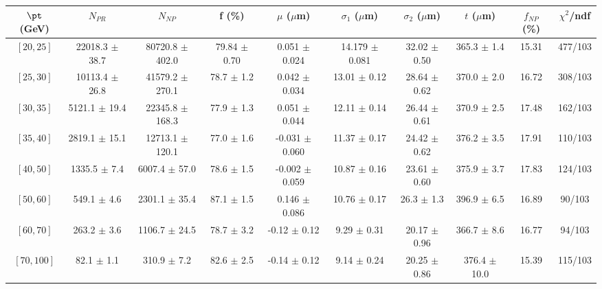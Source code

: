 \begin{tabular}{c||c|c|c|c|c|c|c||c|c}
$\pt$ (GeV) & $N_{PR}$ & $N_{NP}$ & f (\%) & $\mu$ ($\mu$m) & $\sigma_1$ ($\mu$m) & $\sigma_2$ ($\mu$m)  & $t$ ($\mu$m) & $f_{NP}$ (\%) & $\chi^2$/ndf \\
\hline
$[20, 25]$ & 22018.3 $\pm$ 38.7 & 80720.8 $\pm$ 402.0 & 79.84 $\pm$ 0.70 & 0.051 $\pm$ 0.024 & 14.179 $\pm$ 0.081 & 32.02 $\pm$ 0.50 & 365.3 $\pm$ 1.4 & 15.31 & 477/103\\
$[25, 30]$ & 10113.4 $\pm$ 26.8 & 41579.2 $\pm$ 270.1 & 78.7 $\pm$ 1.2 & 0.042 $\pm$ 0.034 & 13.01 $\pm$ 0.12 & 28.64 $\pm$ 0.62 & 370.0 $\pm$ 2.0 & 16.72 & 308/103\\
$[30, 35]$ & 5121.1 $\pm$ 19.4 & 22345.8 $\pm$ 168.3 & 77.9 $\pm$ 1.3 & 0.051 $\pm$ 0.044 & 12.11 $\pm$ 0.14 & 26.44 $\pm$ 0.61 & 370.9 $\pm$ 2.5 & 17.48 & 162/103\\
$[35, 40]$ & 2819.1 $\pm$ 15.1 & 12713.1 $\pm$ 120.1 & 77.0 $\pm$ 1.6 & -0.031 $\pm$ 0.060 & 11.37 $\pm$ 0.17 & 24.42 $\pm$ 0.62 & 376.2 $\pm$ 3.5 & 17.91 & 110/103\\
$[40, 50]$ & 1335.5 $\pm$ 7.4 & 6007.4 $\pm$ 57.0 & 78.6 $\pm$ 1.5 & -0.002 $\pm$ 0.059 & 10.87 $\pm$ 0.16 & 23.61 $\pm$ 0.60 & 375.9 $\pm$ 3.7 & 17.83 & 124/103\\
$[50, 60]$ & 549.1 $\pm$ 4.6 & 2301.1 $\pm$ 35.4 & 87.1 $\pm$ 1.5 & 0.146 $\pm$ 0.086 & 10.76 $\pm$ 0.17 & 26.3 $\pm$ 1.3 & 396.9 $\pm$ 6.5 & 16.89 & 90/103\\
$[60, 70]$ & 263.2 $\pm$ 3.6 & 1106.7 $\pm$ 24.5 & 78.7 $\pm$ 3.2 & -0.12 $\pm$ 0.12 & 9.29 $\pm$ 0.31 & 20.17 $\pm$ 0.96 & 366.7 $\pm$ 8.6 & 16.77 & 94/103\\
$[70, 100]$ & 82.1 $\pm$ 1.1 & 310.9 $\pm$ 7.2 & 82.6 $\pm$ 2.5 & -0.14 $\pm$ 0.12 & 9.14 $\pm$ 0.24 & 20.25 $\pm$ 0.86 & 376.4 $\pm$ 10.0 & 15.39 & 115/103\\
\end{tabular}
